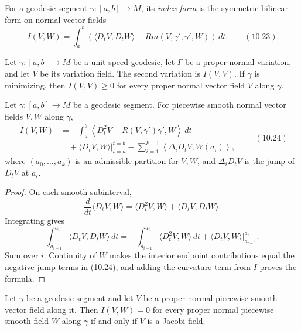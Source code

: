 For a geodesic segment $\gamma:[a,b]\to M$, its \emph{index form} is the
symmetric bilinear form on normal vector fields
\[
I(V,W)=\int_a^b
\left(
\langle D_tV,D_tW\rangle-Rm(V,\gamma',\gamma',W)
\right)\,dt.
\qquad (10.23)
\]

\begin{corollary}
\label{cor:second-variation-minimizing-geodesic}


Let $\gamma:[a,b]\to M$ be a unit-speed geodesic, let $\Gamma$ be a proper
normal variation, and let $V$ be its variation field. The second variation is
$I(V,V)$. If $\gamma$ is minimizing, then
$I(V,V)\geq0$ for every proper normal vector field $V$ along $\gamma$.
\end{corollary}

\begin{proposition}
\label{prop:index-form-jacobi-equation}

Let $\gamma:[a,b]\to M$ be a geodesic segment. For piecewise smooth normal
vector fields $V,W$ along $\gamma$,
\[
\begin{aligned}
I(V,W)
&=-\int_a^b
\left\langle D_t^2V+R(V,\gamma')\gamma',W\right\rangle\,dt\\
&\quad+\left.\langle D_tV,W\rangle\right|_{t=a}^{t=b}
-\sum_{i=1}^{k-1}\left\langle\Delta_iD_tV,W(a_i)\right\rangle,
\end{aligned}
\qquad (10.24)
\]
where $(a_0,\ldots,a_k)$ is an admissible partition for $V,W$, and
$\Delta_iD_tV$ is the jump of $D_tV$ at $a_i$.

\begin{proof}
\sketch On each smooth subinterval,
\[
\frac d{dt}\langle D_tV,W\rangle
=\langle D_t^2V,W\rangle+\langle D_tV,D_tW\rangle.
\]
Integrating gives
\[
\int_{a_{i-1}}^{a_i}\langle D_tV,D_tW\rangle\,dt
=-\int_{a_{i-1}}^{a_i}\langle D_t^2V,W\rangle\,dt
+\left.\langle D_tV,W\rangle\right|_{a_{i-1}}^{a_i}.
\]
Sum over $i$. Continuity of $W$ makes the interior endpoint contributions
equal the negative jump terms in (10.24), and adding the curvature term from
$I$ proves the formula.
\end{proof}
\end{proposition}

\begin{corollary}
\label{cor:jacobi-field-index-form}

Let $\gamma$ be a geodesic segment and let $V$ be a proper normal piecewise
smooth vector field along it. Then
$I(V,W)=0$ for every proper normal piecewise smooth field $W$ along $\gamma$
if and only if $V$ is a Jacobi field.
\end{corollary}

